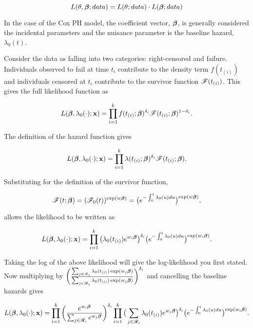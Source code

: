\begin{equation}
    L(\theta,\boldsymbol{\beta};data) = L(\theta;data)\cdot L(\boldsymbol{\beta};data)
\end{equation}

In the case of the Cox PH model, the coefficient vector, $\boldsymbol{\beta}$, is generally considered the incidental parameters and the nuisance parameter is the baseline hazard, $\lambda_0(t)$.

Consider the data as falling into two categories: right-censored and failure. Individuals observed to fail at time $t_i$ contribute to the density term $f(t_{(i)})$ and individuals censored at $t_i$ contribute to the survivor function $\mathscr{F}(t_{(i)})$. This gives the full likelihood function as

\begin{equation}
    L(\boldsymbol{\beta},\lambda_0(\cdot);\textbf{x})=\prod_{i=1}^kf(t_{(i)};\boldsymbol{\beta})^{\delta_i}\mathscr{F}(t_{(i)};\boldsymbol{\beta})^{1-\delta_i}.
\end{equation}

The definition of the hazard function  gives 

\begin{equation}
    L(\boldsymbol{\beta},\lambda_0(\cdot);\textbf{x})=\prod_{i=1}^k\lambda(t_{(i)};\boldsymbol{\beta})^{\delta_i}\mathscr{F}(t_{(i)};\boldsymbol{\beta}).    
\end{equation}

Substituting for the definition of the survivor function,

\begin{equation}
    \mathscr{F}(t;\boldsymbol{\beta})=(\mathscr{F}_0(t))^{\exp(w\boldsymbol{\beta})}=\big(e^{-\int_0^t\lambda_0(u)du}\big)^{\exp(w\boldsymbol{\beta})},
\end{equation}

allows the likelihood to be written as

\begin{equation}
    L(\boldsymbol{\beta},\lambda_0(\cdot);\textbf{x})=\prod_{i=1}^k\big(\lambda_0(t_{(i)})e^{w_i\boldsymbol{\beta}}\big)^{\delta_i}\big(e^{-\int_0^t\lambda_0(u)du}\big)^{\exp(w_i\boldsymbol{\beta})}.
\end{equation}

Taking the log of the above likelihood will give the log-likelihood you first stated. Now multiplying by $\bigg(\frac{\sum_{j\in\mathscr{R}_i}\lambda_0(t_{(i)})\exp({w_j\boldsymbol{\beta}})}{\sum_{j\in\mathscr{R}_i}\lambda_0(t_{(i)})\exp({w_j\boldsymbol{\beta}})}\bigg)^{\delta_i}$ and cancelling the baseline hazards gives

\begin{equation}
    L(\boldsymbol{\beta},\lambda_0(\cdot);\textbf{x})=\prod_{i=1}^k\bigg(\frac{e^{w_i\boldsymbol{\beta}}}{\sum_{j\in\mathscr{R}_i}e^{w_j\boldsymbol{\beta}}}\bigg)^{\delta_i}\prod_{i=1}^k\big(\sum_{j\in\mathscr{R}_i}\lambda_0(t_{(i)})e^{w_j\boldsymbol{\beta}}\big)^{\delta_i}\big(e^{-\int_0^t\lambda_0(u)du}\big)^{\exp(w_i\boldsymbol{\beta})}.
\end{equation}

